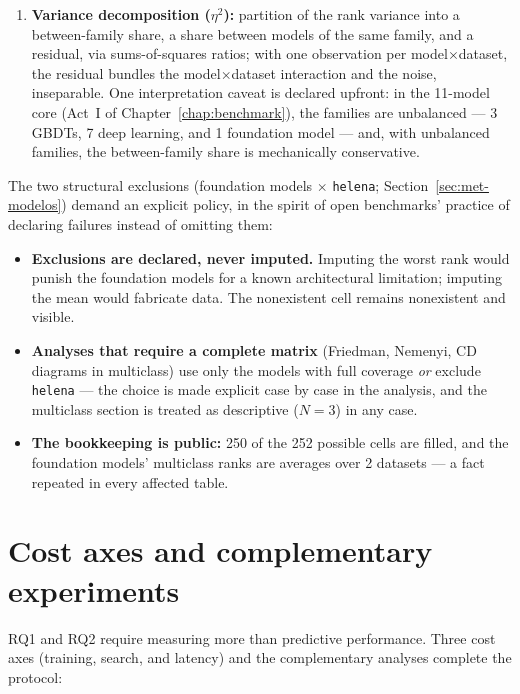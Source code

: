 \begin{enumerate}
    --- which is why the analysis is repeated with sensitivity at
    $\{0.005, 0.01, 0.02\}$, reported in full in
    Chapter~\ref{chap:benchmark}.
  \item \textbf{Variance decomposition ($\eta^2$):} partition of the
    rank variance into a between-family share, a share between
    models of the same family, and a residual, via sums-of-squares
    ratios; with one observation per model$\times$dataset, the
    residual bundles the model$\times$dataset interaction and the
    noise, inseparable. One interpretation caveat is declared
    upfront: in the 11-model core (Act~I of
    Chapter~\ref{chap:benchmark}), the families are unbalanced --- 3
    GBDTs, 7 deep learning, and 1 foundation model --- and, with
    unbalanced families, the between-family share is mechanically
    conservative.
\end{enumerate}

The two structural exclusions (foundation models $\times$
\texttt{helena}; Section~\ref{sec:met-modelos}) demand an explicit
policy, in the spirit of open benchmarks' practice of declaring
failures instead of omitting them:

\begin{itemize}
  \item \textbf{Exclusions are declared, never imputed.} Imputing
    the worst rank would punish the foundation models for a known
    architectural limitation; imputing the mean would fabricate
    data. The nonexistent cell remains nonexistent and visible.
  \item \textbf{Analyses that require a complete matrix} (Friedman,
    Nemenyi, CD diagrams in multiclass) use only the models with
    full coverage \emph{or} exclude \texttt{helena} --- the choice
    is made explicit case by case in the analysis, and the
    multiclass section is treated as descriptive ($N=3$) in any
    case.
  \item \textbf{The bookkeeping is public:} 250 of the 252 possible
    cells are filled, and the foundation models' multiclass ranks
    are averages over 2 datasets --- a fact repeated in every
    affected table.
\end{itemize}

\section{Cost axes and complementary experiments}
\label{sec:met-custo}

RQ1 and RQ2 require measuring more than predictive performance.
Three cost axes (training, search, and latency) and the
complementary analyses complete the protocol:

